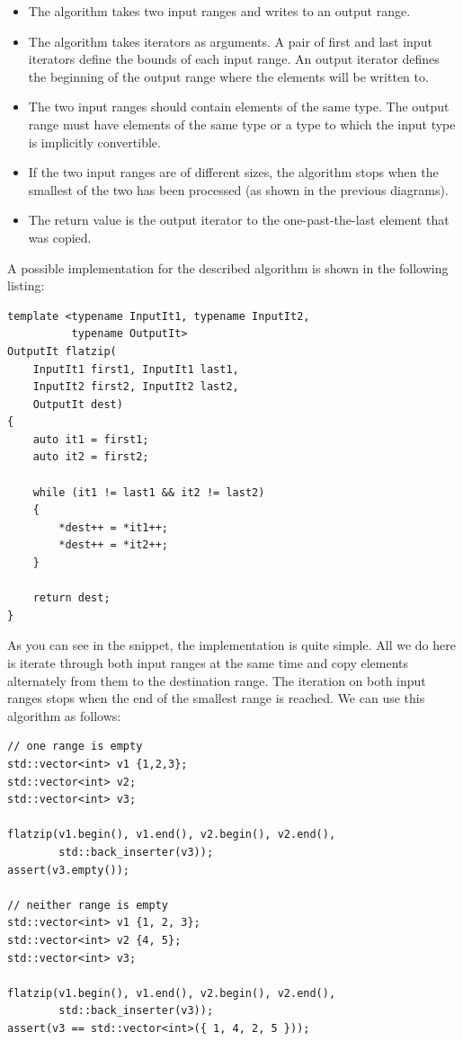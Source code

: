 \begin{itemize}
\item
The algorithm takes two input ranges and writes to an output range.

\item
The algorithm takes iterators as arguments. A pair of first and last input iterators define the bounds of each input range. An output iterator defines the beginning of the output range where the elements will be written to.

\item
The two input ranges should contain elements of the same type. The output range must have elements of the same type or a type to which the input type is implicitly convertible.

\item
If the two input ranges are of different sizes, the algorithm stops when the smallest of the two has been processed (as shown in the previous diagrams).

\item
The return value is the output iterator to the one-past-the-last element that was copied.
\end{itemize}

A possible implementation for the described algorithm is shown in the following listing:

\begin{lstlisting}[style=styleCXX]
template <typename InputIt1, typename InputIt2,
		  typename OutputIt>
OutputIt flatzip(
	InputIt1 first1, InputIt1 last1,
	InputIt2 first2, InputIt2 last2,
	OutputIt dest)
{
	auto it1 = first1;
	auto it2 = first2;
	
	while (it1 != last1 && it2 != last2)
	{
		*dest++ = *it1++;
		*dest++ = *it2++;
	}

	return dest;
}
\end{lstlisting}

As you can see in the snippet, the implementation is quite simple. All we do here is iterate through both input ranges at the same time and copy elements alternately from them to the destination range. The iteration on both input ranges stops when the end of the smallest range is reached. We can use this algorithm as follows:

\begin{lstlisting}[style=styleCXX]
// one range is empty
std::vector<int> v1 {1,2,3};
std::vector<int> v2;
std::vector<int> v3;

flatzip(v1.begin(), v1.end(), v2.begin(), v2.end(),
		std::back_inserter(v3));
assert(v3.empty());

// neither range is empty
std::vector<int> v1 {1, 2, 3};
std::vector<int> v2 {4, 5};
std::vector<int> v3;

flatzip(v1.begin(), v1.end(), v2.begin(), v2.end(),
		std::back_inserter(v3));
assert(v3 == std::vector<int>({ 1, 4, 2, 5 }));
\end{lstlisting}

